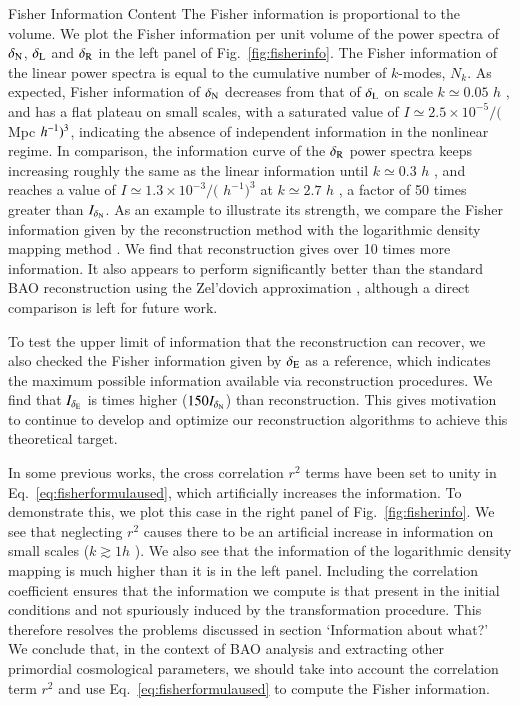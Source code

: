 \begin{section}{Fisher Information Content}
  The Fisher information is proportional to the volume. 
  We plot the Fisher information per unit volume of the power spectra of
  $\delta_\mathrm{\textcolor{black}{N}}$, $\delta_\mathrm{\textcolor{black}{L}}$ and $\delta_\mathrm{\textcolor{black}{R}}$ in the left panel of 
  Fig.~\ref{fig:fisherinfo}. The Fisher information of the linear 
  power spectra is equal to the cumulative number of $k$-modes, $N_k$. As expected, Fisher information of
  $\delta_\mathrm{\textcolor{black}{N}}$ decreases from that of $\delta_\mathrm{\textcolor{black}{L}}$ on scale
  $k \simeq 0.05$ $h$ , and has a flat plateau on small scales, 
  with a saturated value of
  $I \simeq 2.5 \times 10^{-5}/($Mpc $\textcolor{black}{h^{-1}})^3$, indicating
  the absence of independent information in the nonlinear
  regime.  In comparison, the information curve of the $\delta_\mathrm{\textcolor{black}{R}}$ power
  spectra keeps increasing roughly the same as the linear information
  until $k\simeq 0.3$ $h$ , and reaches a value of 
  $I \simeq 1.3 \times 10^{-3}/($ $h^{-1})^3$ at $k \simeq 2.7$ $h$ ,
  a factor of 50 times greater than $I_{\delta_\mathrm{\textcolor{black}{N}}}$.
  As an example to illustrate its strength, we compare the Fisher information given by the  reconstruction method
  with the logarithmic density mapping method \citep{bib:Mark2009}. We find that 
  reconstruction gives over 10 times more information.  It also appears to perform 
  significantly better than the standard BAO reconstruction using the Zel'dovich 
  approximation \citep{bib:Ngan2012}, although a direct comparison is left for future work.
  
  To test the upper limit of information that the  reconstruction can recover, 
  we also checked the Fisher information given by $\delta_\mathrm{\textcolor{black}{E}}$ \citep{bib:Yu2016} as a reference, 
  which indicates the maximum possible information available via reconstruction procedures.
  We find that $I_{\delta_\mathrm{\textcolor{black}{E}}}$ is  times higher ($150 I_{\delta_\mathrm{\textcolor{black}{N}}}$) than  reconstruction.
  This gives motivation to continue to develop and optimize our 
  reconstruction algorithms to achieve this theoretical target.
  
  In some previous works, the cross correlation $r^2$ terms have been set
  to unity in Eq.~\ref{eq:fisherformulaused}, which artificially
  increases the information. To demonstrate this, we plot this case in the right panel of 
  Fig.~\ref{fig:fisherinfo}.  We see that neglecting $r^2$ causes there to be an artificial 
  increase in information on small scales ($k\gtrsim 1 h$ ).  We also see that 
  the information of the logarithmic density
  mapping is much higher than it is in the left panel.  Including the correlation coefficient 
  ensures that the information we compute is that present in the initial conditions and not 
  spuriously induced by the transformation procedure.  This therefore resolves the problems 
  discussed in \cites{bib:HarnoisD2013} section `Information about what?'
  We conclude that, in the context of BAO analysis and extracting other primordial cosmological
  parameters, we should take into account the correlation term $r^2$ and
  use Eq.~\ref{eq:fisherformulaused} to compute the Fisher information.
  

\end{section}
